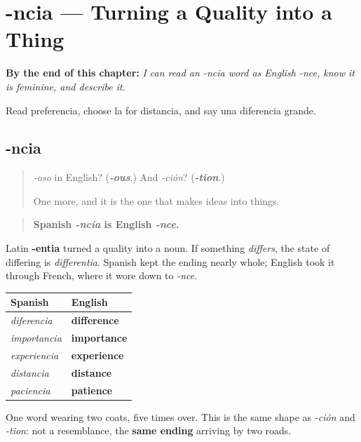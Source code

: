 
\chapter{-ncia --- Turning a Quality into a Thing}
\label{ch:ncia}

\begin{chapteropening}
\textbf{By the end of this chapter:} \emph{I can read an -ncia word as English -nce, know it is feminine, and describe it.}

Read preferencia, choose la for distancia, and say una diferencia grande.
\end{chapteropening}

\section[-ncia]{-ncia}

\label{lesson:ES-C09-ncia}



\begin{quote}
\emph{-oso} in English? (\emph{\textbf{-ous}}.) And \emph{-ción}? (\emph{\textbf{-tion}}.)

One more, and it is the one that makes ideas into things.
\end{quote}

\begin{grammarlens}[title={Grammar Lens: a quality, made into a thing}]
\begin{quote}
\textbf{Spanish \emph{-ncia} is English \emph{-nce}.}
\end{quote}

Latin \textbf{-entia} turned a quality into a noun. If something \emph{differs}, the state of differing is \emph{differentia}. Spanish kept the ending nearly whole; English took it through French, where it wore down to \emph{-nce}.

\noindent
\begin{tabularx}{\linewidth}{@{}>{\raggedright\arraybackslash}X>{\raggedright\arraybackslash}X@{}}
\toprule
\textbf{Spanish} & \textbf{English} \\
\midrule
\emph{diferencia} & \textbf{difference} \\
\emph{importancia} & \textbf{importance} \\
\emph{experiencia} & \textbf{experience} \\
\emph{distancia} & \textbf{distance} \\
\emph{paciencia} & \textbf{patience} \\
\bottomrule
\end{tabularx}

One word wearing two coats, five times over. This is the same shape as \emph{-ción} and \emph{-tion}: not a resemblance, the \textbf{same ending} arriving by two roads.
\end{grammarlens}

